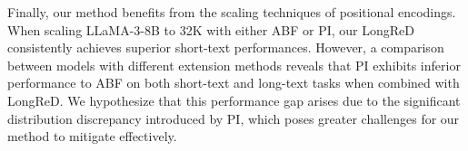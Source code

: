 Finally, our method benefits from the scaling techniques of positional encodings. When scaling LLaMA-3-8B to 32K with either ABF or PI, our LongReD consistently achieves superior short-text performances. However, a comparison between models with different extension methods reveals that PI exhibits inferior performance to ABF on both short-text and long-text tasks when combined with LongReD. 
We hypothesize that this performance gap arises due to the significant distribution discrepancy introduced by PI, which poses greater challenges for our method to mitigate effectively.



